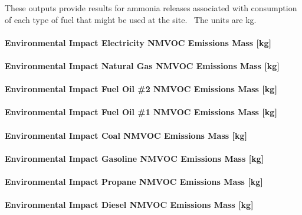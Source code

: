These outputs provide results for ammonia releases associated with consumption of each type of fuel that might be used at the site.~ The units are kg.

\paragraph{Environmental Impact Electricity NMVOC Emissions Mass {[}kg{]}}\label{environmental-impact-electricity-nmvoc-emissions-mass-kg}

\paragraph{Environmental Impact Natural Gas NMVOC Emissions Mass {[}kg{]}}\label{environmental-impact-natural-gas-nmvoc-emissions-mass-kg}

\paragraph{Environmental Impact Fuel Oil \#2 NMVOC Emissions Mass {[}kg{]}}\label{environmental-impact-fuel-oil-2-nmvoc-emissions-mass-kg}

\paragraph{Environmental Impact Fuel Oil \#1 NMVOC Emissions Mass {[}kg{]}}\label{environmental-impact-fuel-oil-1-nmvoc-emissions-mass-kg}

\paragraph{Environmental Impact Coal NMVOC Emissions Mass {[}kg{]}}\label{environmental-impact-coal-nmvoc-emissions-mass-kg}

\paragraph{Environmental Impact Gasoline NMVOC Emissions Mass {[}kg{]}}\label{environmental-impact-gasoline-nmvoc-emissions-mass-kg}

\paragraph{Environmental Impact Propane NMVOC Emissions Mass {[}kg{]}}\label{environmental-impact-propane-nmvoc-emissions-mass-kg}

\paragraph{Environmental Impact Diesel NMVOC Emissions Mass {[}kg{]}}\label{environmental-impact-diesel-nmvoc-emissions-mass-kg}

